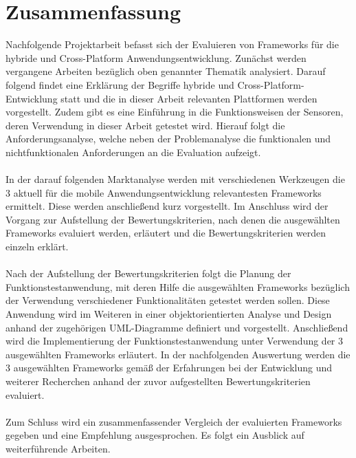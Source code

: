 \chapter*{Zusammenfassung}

Nachfolgende Projektarbeit befasst sich der Evaluieren von Frameworks für die hybride und Cross-Platform Anwendungsentwicklung. Zunächst werden vergangene Arbeiten bezüglich oben genannter Thematik analysiert. Darauf folgend findet eine Erklärung der Begriffe hybride und Cross-Platform-Entwicklung statt und die in dieser Arbeit relevanten Plattformen werden vorgestellt. Zudem gibt es eine Einführung in die Funktionsweisen der Sensoren, deren Verwendung in dieser Arbeit getestet wird. Hierauf folgt die Anforderungsanalyse, welche neben der Problemanalyse die funktionalen und nichtfunktionalen Anforderungen an die Evaluation aufzeigt.
\\
\\
In der darauf folgenden Marktanalyse werden mit verschiedenen Werkzeugen die 3 aktuell für die mobile Anwendungsentwicklung relevantesten Frameworks ermittelt. Diese werden anschließend kurz vorgestellt. Im Anschluss wird der Vorgang zur Aufstellung der Bewertungskriterien, nach denen die ausgewählten Frameworks evaluiert werden, erläutert und die Bewertungskriterien werden einzeln erklärt. 
\\
\\
Nach der Aufstellung der Bewertungskriterien folgt die Planung der Funktionstestanwendung, mit deren Hilfe die ausgewählten Frameworks bezüglich der Verwendung verschiedener Funktionalitäten getestet werden sollen. Diese Anwendung wird im Weiteren in einer objektorientierten Analyse und Design anhand der zugehörigen UML-Diagramme definiert und vorgestellt. Anschließend wird die Implementierung der Funktionstestanwendung unter Verwendung der 3 ausgewählten Frameworks erläutert. In der nachfolgenden Auswertung werden die 3 ausgewählten Frameworks gemäß der Erfahrungen bei der Entwicklung und weiterer Recherchen anhand der zuvor aufgestellten Bewertungskriterien evaluiert. 
\\
\\
Zum Schluss wird ein zusammenfassender Vergleich der evaluierten Frameworks gegeben und eine Empfehlung ausgesprochen. Es folgt ein Ausblick auf weiterführende Arbeiten.  
